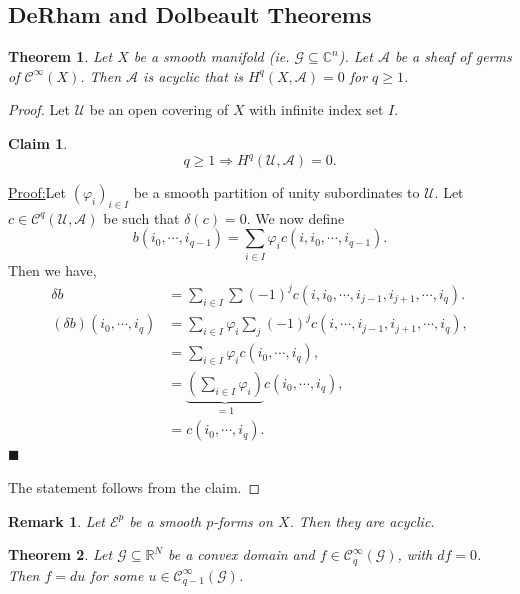 \documentclass{article}
\newtheorem{theorem}{Theorem} [section]
\newtheorem{remark}{Remark}[section]
\newtheorem{claim}{Claim}
\newenvironment{claimproof}[1]{\par\noindent\underline{Proof:}\space#1}{\hfill $\blacksquare$}
\newcommand{\cA}[0]{\mathcal{A}}
\newcommand{\cC}[0]{\mathcal{C}}
\newcommand{\cE}[0]{\mathcal{E}}
\newcommand{\sU}[0]{\mathscr{U}}
\newcommand{\R}[0]{\mathbb{R}}
\newcommand{\C}[0]{\mathbb{C}}
\newcommand{\G}[0]{\mathcal{G}}
\newcommand{\ck}[1]{\mathcal{C}^{#1}}
\newcommand{\cinf}[0]{\ck{\infty}}
\begin{document}
  \subsection{DeRham and Dolbeault Theorems}
  
\begin{theorem}
  Let $X$ be a smooth manifold (ie. $\G\subseteq\C^n$). Let $\cA$ be a sheaf of germs of $\cinf(X)$. Then $\cA$ is acyclic that is $H^q(X,\cA)=0$ for $q\geq1$.
\end{theorem}
\setcounter{claim}{0}
\begin{proof}
  Let $\sU$ be an open covering of $X$ with infinite index set $I$. 
  \begin{claim}
  \begin{equation*}
    q\geq1\Rightarrow H^q(\sU,\cA) = 0.
  \end{equation*}
  \end{claim}
  \begin{claimproof}
  Let $(\varphi_i)_{i\in I}$ be a smooth partition of unity subordinates to $\sU$. Let $c\in\cC^q(\sU,\cA)$ be such that $\delta(c)=0$.
  We now define 
  \begin{equation*}
    b(i_0,\cdots,i_{q-1}) = \sum_{i\in I}\varphi_i c(i,i_0,\cdots,i_{q-1}).
  \end{equation*}
  Then we have,
  \begin{align*}
    \delta b & = \sum_{i\in I}\sum (-1)^jc(i,i_0,\cdots,i_{j-1},i_{j+1},\cdots,i_q).\\
    (\delta b)(i_0,\cdots,i_q) &= \sum_{i\in I}\varphi_i\sum_{j}(-1)^jc(i,\cdots,i_{j-1},i_{j+1},\cdots,i_q),\\
    & = \sum_{i\in I} \varphi_i c(i_0,\cdots,i_q),\\
    & = \underbrace{\left(\sum_{i\in I}\varphi_i\right)}_{=1}c(i_0,\cdots,i_q),\\
    & = c(i_0,\cdots,i_q).
  \end{align*}
  \end{claimproof}
  \par The statement follows from the claim.
\end{proof}
\begin{remark}
  Let $\cE^p$ be a smooth $p$-forms on $X$. Then they are acyclic.
\end{remark}

\begin{theorem}
  Let $\G\subseteq\R^N$ be a convex domain and $f\in\cinf_q(\G)$, with $df=0$. Then $f=du$ for some $u\in\cinf_{q-1}(\G)$.
\end{theorem}
\end{document}

